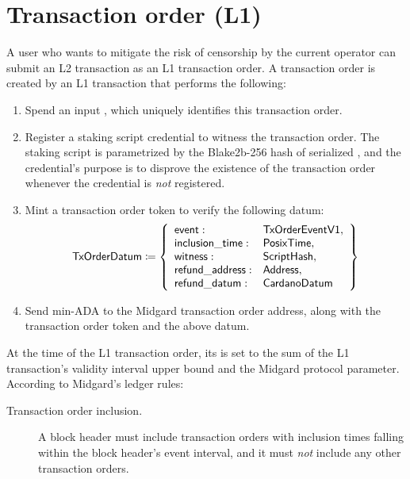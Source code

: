 \documentclass[../midgard.tex]{subfiles}
\begin{document}
\section{Transaction order (L1)}
\label{h:transaction-order}

A user who wants to mitigate the risk of censorship by the current operator can submit an L2 transaction as an L1 transaction order.
A transaction order is created by an L1 transaction that performs the following:
\begin{enumerate}
    \item Spend an input , which uniquely identifies this transaction order.
    \item Register a staking script credential to witness the transaction order.
      The staking script is parametrized by the Blake2b-256 hash of serialized , and the credential's purpose is to disprove the existence of the transaction order whenever the credential is \emph{not} registered.
    \item Mint a transaction order token to verify the following datum:
        \begin{equation*}
        \mathsf{TxOrderDatum} \coloneq \left\{
            \begin{array}{ll}
                \mathsf{event} : & \mathsf{TxOrderEventV1}, \\
                \mathsf{inclusion\_time} : & \mathsf{PosixTime}, \\
                \mathsf{witness} : & \mathsf{ScriptHash}, \\
                \mathsf{refund\_address}: & \mathsf{Address}, \\
                \mathsf{refund\_datum}: & \mathsf{CardanoDatum}
            \end{array}
            \right\}
        \end{equation*}
    \item Send min-ADA to the Midgard transaction order address, along with the transaction order token and the above datum.
\end{enumerate}

At the time of the L1 transaction order, its  is set to the sum of the L1 transaction's validity interval upper bound and the  Midgard protocol parameter.
According to Midgard's ledger rules:
\begin{description}
    \item[Transaction order inclusion.] A block header must include transaction orders with inclusion times falling within the block header's event interval, and it must \emph{not} include any other transaction orders.
\end{description}
\end{document}
